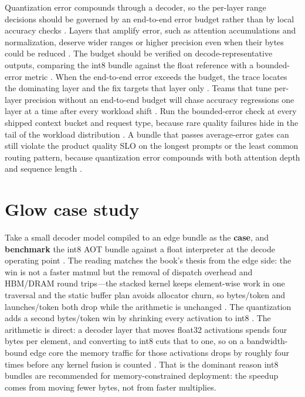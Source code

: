 Quantization error compounds through a decoder, so the per-layer range decisions should be governed by an end-to-end error budget rather than by local accuracy checks \citep{dao2022flashattention,patel2025llminference}. Layers that amplify error, such as attention accumulations and normalization, deserve wider ranges or higher precision even when their bytes could be reduced \citep{memoryfloor2026,dao2022flashattention}. The budget should be verified on decode-representative outputs, comparing the int8 bundle against the float reference with a bounded-error metric \citep{rotem2018glow,patel2025llminference}. When the end-to-end error exceeds the budget, the trace locates the dominating layer and the fix targets that layer only \citep{chen2020compilerbasedhardw,rotem2018glow}. Teams that tune per-layer precision without an end-to-end budget will chase accuracy regressions one layer at a time after every workload shift \citep{taxbreak2026,memoryfloor2026}.
Run the bounded-error check at every shipped context bucket and request type, because rare quality failures hide in the tail of the workload distribution \citep{patel2025llminference,dao2022flashattention}. A bundle that passes average-error gates can still violate the product quality SLO on the longest prompts or the least common routing pattern, because quantization error compounds with both attention depth and sequence length \citep{kwon2023vllm,memoryfloor2026}.

\section{Glow case study}
\label{sec:ch19_glow_case_study}

Take a small decoder model compiled to an edge bundle as the \textbf{case}, and \textbf{benchmark} the int8 AOT bundle against a float interpreter at the decode operating point \citep{rotem2018glow,taxbreak2026}. The reading matches the book's thesis from the edge side: the win is not a faster matmul but the removal of dispatch overhead and HBM/DRAM round trips---the stacked kernel keeps element-wise work in one traversal and the static buffer plan avoids allocator churn, so bytes/token and launches/token both drop while the arithmetic is unchanged \citep{memoryfloor2026,dao2022flashattention}. The quantization adds a second bytes/token win by shrinking every activation to int8 \citep{pytorchglow2024}. The arithmetic is direct: a decoder layer that moves float32 activations spends four bytes per element, and converting to int8 cuts that to one, so on a bandwidth-bound edge core the memory traffic for those activations drops by roughly four times before any kernel fusion is counted \citep{taxbreak2026}. That is the dominant reason int8 bundles are recommended for memory-constrained deployment: the speedup comes from moving fewer bytes, not from faster multiplies.

